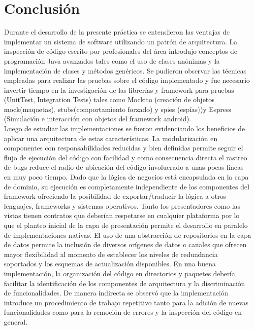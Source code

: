 \section{Conclusión}
Durante el desarrollo de la presente práctica se entendieron las ventajas de implementar un sistema de software utilizando un patrón de arquitectura. La inspección de código escrito por profesionales del área introdujo conceptos de programación Java avanzados tales como el uso de clases anónimas \cite{anon_pankaj} y la implementación de clases y métodos genéricos\cite{gen_caules}. Se pudieron observar las técnicas empleadas para realizar las pruebas sobre el código implementado y fue necesario invertir tiempo en la investigación de las librerías y framework para pruebas (UnitTest, Integration Tests) tales como Mockito \cite{mockito_lars} (creación de objetos mock(maquetas), stubs(comportamiento forzado) y spies (espías))y Espress \cite{espress_maksim} (Simulación e interacción con objetos del framework android).\\
Luego de estudiar las implementaciones se fueron evidenciando los beneficios de aplicar una arquitectura de estas características. La modularización en componentes con responsabilidades reducidas y bien definidas permite seguir el flujo de ejecución del código con facilidad y como consecuencia directa el rastreo de bugs reduce el radio de ubicación del código involucrado a unas pocas líneas en muy poco tiempo.
Dado que la lógica de negocios está encapsulada en la capa de dominio, su ejecución es completamente independiente de los componentes del framework ofreciendo la posibilidad de exportar/traducir la lógica a otros lenguajes, frameworks y sistemas operativos.
Tanto los presentadores como las vistas tienen contratos que deberían respetarse en cualquier plataforma por lo que el planteo inicial de la capa de presentación permite el desarrollo en paralelo de implementaciones nativas.
El uso de una abstracción de repositorios en la capa de datos permite la inclusión de diversos orígenes de datos o canales que ofrecen mayor flexibilidad al momento de establecer los niveles de redundancia soportados y los esquemas de actualización disponibles. 
En una buena implementación, la organización del código en directorios y paquetes debería facilitar la identificación de los componentes de arquitectura y la discriminación de funcionalidades.   
De manera indirecta se observó que la implementación introduce un procedimiento de trabajo repetitivo tanto para la adición de nuevas funcionalidades como para la remoción de errores y la inspección del código en general.\\
